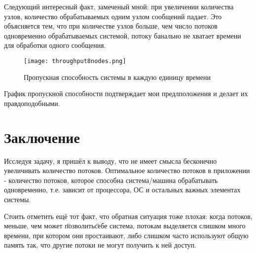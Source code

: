 \documentclass{mipt-thesis-bs}
\begin{document}
Следующий интересный факт, замеченый мной: при увеличении количества узлов, количество обрабатываемых одним узлом сообщений падает. Это объясняется тем, что при количестве узлов больше, чем число потоков одновременно обрабатываемых системой, потоку банально не хватает времени для обработки одного сообщения.


\begin{figure}
\centering
\texttt{[image: throughput8nodes.png]}
\caption{Пропускная способность системы в каждую единицу времени}
 \label{figure:throughput1}
\end{figure}

График пропускной способности подтверждает мои предлположения и делает их правдоподобными.

\chapter{Заключение}
Исследуя задачу, я пришёл к выводу, что не имеет смысла бесконечно увеличивать количество потоков. Оптимальное количество потоков в приложении - количество потоков, которое способна система/машина обрабатывать одновременно, т.е. зависит от процессора, ОС и остальных важных элементах системы. 

Стоить отметить ещё тот факт, что обратная ситуация тоже плохая: когда потоков, меньше, чем может \"позволить\" себе система, потокам выделяется слишком много времени, при котором они простаивают, либо слишком часто используют общую память так, что другие потоки не могут получить к ней доступ.
\end{document}
